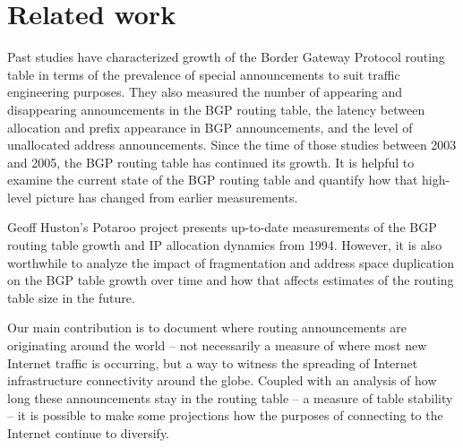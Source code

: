 \section{Related work}
\label{sec:related_work}

Past studies \cite{Meng:2005:IPv4-address} \cite{Xu:2003:IPv4-Address}
\cite{Meng:2003:An-analysis-of-BGP-routing} have characterized growth of the
Border Gateway Protocol routing table in terms of the prevalence of special
announcements to suit traffic engineering purposes. They also measured the number of 
appearing and disappearing announcements in the BGP routing table, the latency between allocation and prefix appearance in BGP announcements, and the level of unallocated address announcements.
Since the time of those studies between 2003 and 2005, the
BGP routing table has continued its growth. It is helpful to examine
the current state of the BGP routing table and quantify how that high-level
picture has changed from earlier measurements.

Geoff Huston's Potaroo project \cite{::IPv4-Address-Report} presents up-to-date
measurements of the BGP routing table growth and IP allocation dynamics from 
1994. However, it is also
worthwhile to analyze the impact of fragmentation and address space duplication on the BGP table growth over time
and how that affects estimates of the routing table size in the future. 

Our main contribution is to document where routing announcements are originating around the world --
not necessarily a measure of where most new Internet traffic is
occurring, but a way to witness the spreading of Internet infrastructure
connectivity around the globe. Coupled with an analysis of how long these
announcements stay in the routing table -- a measure of table stability -- it
is possible to make some projections how the purposes of connecting to the
Internet continue to diversify.

